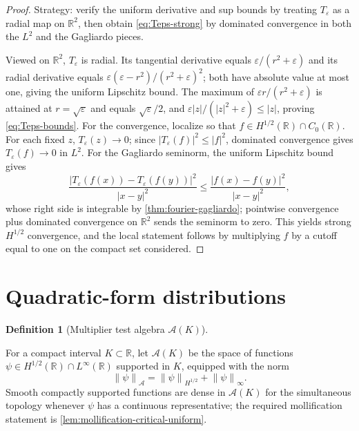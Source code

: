 \documentclass[11pt,oneside]{book}
\providecommand{\uses}[1]{}
\theoremstyle{definition}
\newtheorem{definition}[theorem]{Definition}
\theoremstyle{remark}
\newcommand{\R}{\mathbb R}
\newcommand{\1}{\mathbf 1}
\newcommand{\norm}[1]{\left\lVert #1\right\rVert}
\newcommand{\eps}{\varepsilon}
\begin{document}
\begin{proof}
\uses{def:Teps-regularizer, thm:fourier-gagliardo}
Strategy: verify the uniform derivative and sup bounds by treating $T_\eps$ as a radial map on $\R^2$, then obtain \eqref{eq:Teps-strong} by dominated convergence in both the $L^2$ and the Gagliardo pieces.

Viewed on $\R^2$, $T_\eps$ is radial. Its tangential derivative equals $\eps/(r^2+\eps)$ and its radial derivative equals $\eps(\eps-r^2)/(r^2+\eps)^2$; both have absolute value at most one, giving the uniform Lipschitz bound. The maximum of $\eps r/(r^2+\eps)$ is attained at $r=\sqrt\eps$ and equals $\sqrt\eps/2$, and $\eps|z|/(|z|^2+\eps)\le|z|$, proving \eqref{eq:Teps-bounds}. For the convergence, localize so that $f\in H^{1/2}(\R)\cap C_0(\R)$. For each fixed $z$, $T_\eps(z)\to0$; since $|T_\eps(f)|^2\le|f|^2$, dominated convergence gives $T_\eps(f)\to0$ in $L^2$. For the Gagliardo seminorm, the uniform Lipschitz bound gives
\[
 \frac{|T_\eps(f(x))-T_\eps(f(y))|^2}{|x-y|^2}
 \le\frac{|f(x)-f(y)|^2}{|x-y|^2},
\]
whose right side is integrable by \cref{thm:fourier-gagliardo}; pointwise convergence plus dominated convergence on $\R^2$ sends the seminorm to zero. This yields strong $H^{1/2}$ convergence, and the local statement follows by multiplying $f$ by a cutoff equal to one on the compact set considered.
\end{proof}

\section{Quadratic-form distributions}

\begin{definition}[Multiplier test algebra $\mathcal A(K)$]\label{def:multiplier-test-algebra}
\uses{def:Hs-space}
For a compact interval $K\subset\R$, let $\mathcal A(K)$ be the space of functions $\psi\in H^{1/2}(\R)\cap L^\infty(\R)$ supported in $K$, equipped with the norm
\[
 \norm{\psi}_{\mathcal A}=\norm{\psi}_{H^{1/2}}+\norm{\psi}_{\infty}.
\]
Smooth compactly supported functions are dense in $\mathcal A(K)$ for the simultaneous topology whenever $\psi$ has a continuous representative; the required mollification statement is \cref{lem:mollification-critical-uniform}.
\end{definition}
\end{document}
